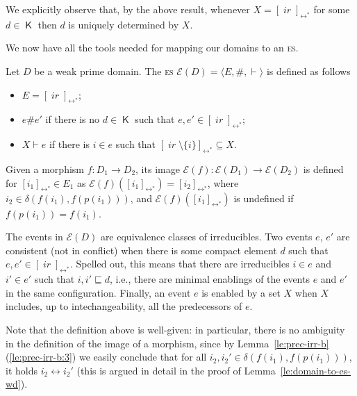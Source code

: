 \documentclass[conference]{IEEEtran}
\newcommand{\compact}[1]{\ensuremath{\mathop{\mathsf{K}({#1})}}}
\newcommand{\ir}[1]{\ensuremath{\mathop{\mathit{ir}({#1})}}}
\newcommand{\diff}[2]{\ensuremath{\delta({#1},{#2})}}
\newcommand{\esabbr}{\textsc{es}}
\newcommand{\pred}[1]{\ensuremath{\mathit{p}({#1})}}
\newcommand{\eqclass}[2][]{\ensuremath{[{#2}]_{\scriptscriptstyle {#1}}}}
\newcommand{\eqclassir}[1]{\ensuremath{\eqclass[\leftrightarrow^*]{#1}}}
\newcommand{\zev}[0]{\ensuremath{\mathcal{E}}}
\newcommand{\ev}[1]{\ensuremath{\zev({#1})}}
\begin{document}
We explicitly observe that, by the above result, whenever $X = \eqclassir{\ir{d}}$ for some $d \in \compact{D}$ then $d$ is uniquely determined by $X$.


We now have all the tools needed for mapping our domains to an {\esabbr}.

\begin{definition}
\label{de:esfusdom}
  Let $D$ be a weak prime domain. The {\esabbr}
  $\ev{D} = \langle E, \#, \vdash \rangle$ is defined as
  follows
  \begin{itemize}

  \item $E = \eqclassir{\ir{D}}$;

  \item $e \# e'$ if there is no $d \in \compact{D}$ such that
    $e, e' \in \eqclassir{\ir{d}}$;

  \item $X \vdash e$ if there is $i \in e$ such that
    $\eqclassir{\ir{i} \setminus \{ i \}} \subseteq X$.

  \end{itemize}

  Given a morphism $f : D_1 \to D_2$, its image
  $\ev{f} : \ev{D_1} \to \ev{D_2}$ is defined  for
  $\eqclassir{i_1} \in {E_1}$ as 
  $\ev{f}(\eqclassir{i_1})= \eqclassir{i_2}$,
  where $i_2 \in \diff{f(i_1)}{f(\pred{i_1})}$, and
  $\ev{f}(\eqclassir{i_1})$ is undefined if $f(\pred{i_1}) = f(i_1)$.
\end{definition}

The events in $\ev{D}$ are equivalence classes of irreducibles. Two events $e$, $e'$ are consistent (not in conflict) when there is some compact element $d$ such that $e, e' \in \eqclassir{\ir{d}}$. Spelled out, this means that there are irreducibles $i \in e$ and $i' \in e'$ such that $i, i' \sqsubseteq d$, i.e., there are minimal enablings of the events $e$ and $e'$ in the same configuration. Finally, an event $e$ is enabled by a set $X$ when $X$ includes, up to intechangeability, all the predecessors of $e$.

Note that the definition above is well-given: in particular, there is no
ambiguity in the definition of the image of a morphism, since by
Lemma~\ref{le:prec-irr-b}(\ref{le:prec-irr-b:3}) we easily conclude
that for all $i_2, i_2' \in \diff{f(i_1)}{f(\pred{i_1})}$, it
holds $i_2 \leftrightarrow i_2'$ (this is argued in detail in the proof of Lemma~\ref{le:domain-to-es-wd}).
\end{document}
